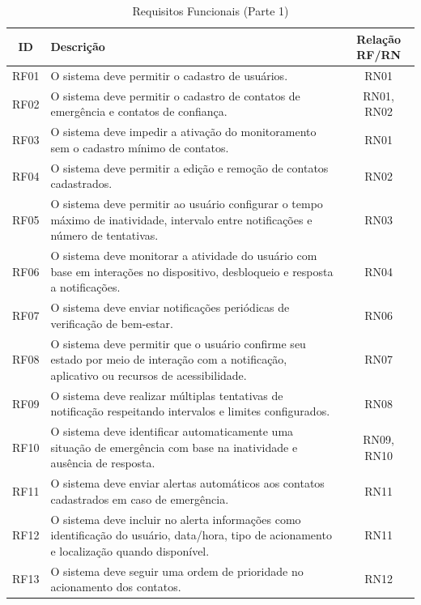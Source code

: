 \begin{table}[H]
\caption{Requisitos Funcionais (Parte 1)}
\label{quad_rf1}
\centering
\begin{tabular}{|c|p{8cm}|c|}
\hline
\textbf{ID} & \textbf{Descrição} & \textbf{Relação RF/RN} \\
\hline
RF01 & O sistema deve permitir o cadastro de usuários. & RN01 \\
\hline
RF02 & O sistema deve permitir o cadastro de contatos de emergência e contatos de confiança. & RN01, RN02 \\
\hline
RF03 & O sistema deve impedir a ativação do monitoramento sem o cadastro mínimo de contatos. & RN01 \\
\hline
RF04 & O sistema deve permitir a edição e remoção de contatos cadastrados. & RN02 \\
\hline
RF05 & O sistema deve permitir ao usuário configurar o tempo máximo de inatividade, intervalo entre notificações e número de tentativas. & RN03 \\
\hline
RF06 & O sistema deve monitorar a atividade do usuário com base em interações no dispositivo, desbloqueio e resposta a notificações. & RN04 \\
\hline
RF07 & O sistema deve enviar notificações periódicas de verificação de bem-estar. & RN06 \\
\hline
RF08 & O sistema deve permitir que o usuário confirme seu estado por meio de interação com a notificação, aplicativo ou recursos de acessibilidade. & RN07 \\
\hline
RF09 & O sistema deve realizar múltiplas tentativas de notificação respeitando intervalos e limites configurados. & RN08 \\
\hline
RF10 & O sistema deve identificar automaticamente uma situação de emergência com base na inatividade e ausência de resposta. & RN09, RN10 \\
\hline
RF11 & O sistema deve enviar alertas automáticos aos contatos cadastrados em caso de emergência. & RN11 \\
\hline
RF12 & O sistema deve incluir no alerta informações como identificação do usuário, data/hora, tipo de acionamento e localização quando disponível. & RN11 \\
\hline
RF13 & O sistema deve seguir uma ordem de prioridade no acionamento dos contatos. & RN12 \\
\hline

\end{tabular}

\end{table}

